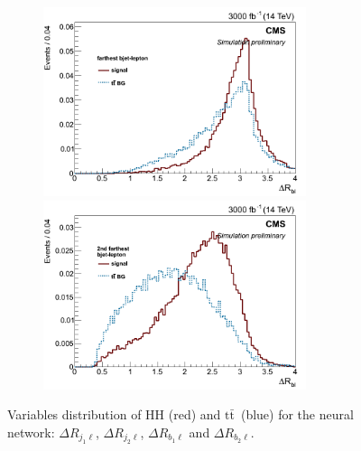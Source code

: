\documentclass[10pt,a4paper]{article}
\newcommand{\ww}{7.7cm} %
\newcommand{\dd}{-2mm} %
\renewcommand{\tt}{$\text{t}\bar{\text{t}}$}
\begin{document}
\begin{figure}[h]
  \begin{subfigure}[b]{17cm}
    \begin{minipage}[h!]{\ww}
      \centering
      \includegraphics[width=\ww]{figs/DeltaR_b1l.png}
    \end{minipage}
    \begin{minipage}[h!]{\ww}
      \centering
      \includegraphics[width=\ww]{figs/DeltaR_b2l.png}
    \end{minipage}
    \hspace{9mm}
  \end{subfigure}	
  \vspace{\dd}
  \caption{Variables distribution of HH (red) and \tt\ (blue) for the neural network: $\Delta R_{j_1\ell}$, $\Delta R_{j_2\ell}$, $\Delta R_{b_1\ell}$ and $\Delta R_{b_2\ell}$.} \label{vars4} %

\end{figure}
\end{document}
